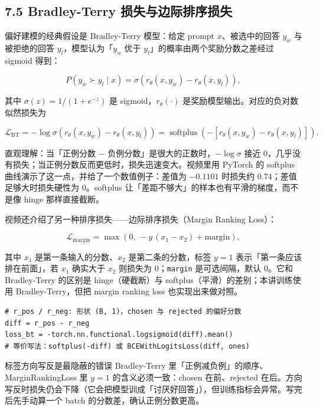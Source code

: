 \subsection{7.5 Bradley-Terry 损失与边际排序损失}

偏好建模的经典假设是 Bradley-Terry 模型：给定 prompt $x$、被选中的回答 $y_w$ 与被拒绝的回答 $y_l$，模型认为「$y_w$ 优于 $y_l$」的概率由两个奖励分数之差经过 sigmoid 得到：

$$
P(y_w \succ y_l \mid x)=\sigma\!\left(r_\theta(x,y_w)-r_\theta(x,y_l)\right),
$$

其中 $\sigma(z)=1/(1+e^{-z})$ 是 sigmoid，$r_\theta(\cdot)$ 是奖励模型输出。对应的负对数似然损失为

$$
\mathcal{L}_{\text{BT}}
=-\log \sigma\!\left(r_\theta(x,y_w)-r_\theta(x,y_l)\right)
=\operatorname{softplus}\!\left(-\left[r_\theta(x,y_w)-r_\theta(x,y_l)\right]\right).
$$

直观理解：当「正例分数 − 负例分数」是很大的正数时，$-\log\sigma$ 接近 0，几乎没有损失；当正例分数反而更低时，损失迅速变大。视频里用 PyTorch 的 softplus 曲线演示了这一点，并给了一个数值例子：差值为 $-0.1101$ 时损失约 $0.74$；差值足够大时损失硬性为 0。softplus 让「差距不够大」的样本也有平滑的梯度，而不是像 hinge 那样直接截断。

视频还介绍了另一种排序损失——边际排序损失（Margin Ranking Loss）：

$$
\mathcal{L}_{\text{margin}}=\max\!\left(0,\,-y\,(x_1-x_2)+\text{margin}\right),
$$

其中 $x_1$ 是第一条输入的分数、$x_2$ 是第二条的分数，标签 $y=1$ 表示「第一条应该排在前面」，若 $x_1$ 确实大于 $x_2$ 则损失为 0；\texttt{margin} 是可选间隔，默认 0。它和 Bradley-Terry 的区别是 hinge（硬截断）与 softplus（平滑）的差别；本讲训练使用 Bradley-Terry，但把 margin ranking loss 也实现出来做对照。

\begin{lstlisting}[caption={Bradley-Terry 损失的核心计算（按视频讲解重写）}]
# r_pos / r_neg: 形状 (B, 1)，chosen 与 rejected 的偏好分数
diff = r_pos - r_neg
loss_bt = -torch.nn.functional.logsigmoid(diff).mean()
# 等价写法：softplus(-diff) 或 BCEWithLogitsLoss(diff, ones)
\end{lstlisting}

\begin{warningbox}{标签方向写反是最隐蔽的错误}
Bradley-Terry 里「正例减负例」的顺序、MarginRankingLoss 里 $y=1$ 的含义必须一致：chosen 在前、rejected 在后。方向写反时损失仍会下降（它会把模型训成「讨厌好回答」），但训练指标会异常。写完后先手动算一个 batch 的分数差，确认正例分数更高。
\end{warningbox}

